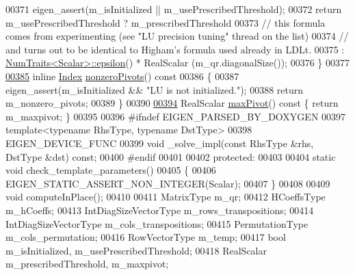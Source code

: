 \begin{DoxyCode}
00371       eigen\_assert(m\_isInitialized || m\_usePrescribedThreshold);
00372       \textcolor{keywordflow}{return} m\_usePrescribedThreshold ? m\_prescribedThreshold
00373       \textcolor{comment}{// this formula comes from experimenting (see "LU precision tuning" thread on the list)}
00374       \textcolor{comment}{// and turns out to be identical to Higham's formula used already in LDLt.}
00375                                       : \hyperlink{group___core___module_struct_eigen_1_1_num_traits}{NumTraits<Scalar>::epsilon}() * RealScalar
      (m\_qr.diagonalSize());
00376     \}
00377 
\hyperlink{group___q_r___module_af1e4d04824084a964c1a6e51db68376f}{00385}     \textcolor{keyword}{inline} \hyperlink{namespace_eigen_a62e77e0933482dafde8fe197d9a2cfde}{Index} \hyperlink{group___q_r___module_af1e4d04824084a964c1a6e51db68376f}{nonzeroPivots}()\textcolor{keyword}{ const}
00386 \textcolor{keyword}{    }\{
00387       eigen\_assert(m\_isInitialized && \textcolor{stringliteral}{"LU is not initialized."});
00388       \textcolor{keywordflow}{return} m\_nonzero\_pivots;
00389     \}
00390 
\hyperlink{group___q_r___module_a7887506237a3bf912aebc9aaa8edacec}{00394}     RealScalar \hyperlink{group___q_r___module_a7887506237a3bf912aebc9aaa8edacec}{maxPivot}()\textcolor{keyword}{ const }\{ \textcolor{keywordflow}{return} m\_maxpivot; \}
00395     
00396 \textcolor{preprocessor}{    #ifndef EIGEN\_PARSED\_BY\_DOXYGEN}
00397     \textcolor{keyword}{template}<\textcolor{keyword}{typename} RhsType, \textcolor{keyword}{typename} DstType>
00398     EIGEN\_DEVICE\_FUNC
00399     \textcolor{keywordtype}{void} \_solve\_impl(\textcolor{keyword}{const} RhsType &rhs, DstType &dst) \textcolor{keyword}{const};
00400 \textcolor{preprocessor}{    #endif}
00401 
00402   \textcolor{keyword}{protected}:
00403     
00404     \textcolor{keyword}{static} \textcolor{keywordtype}{void} check\_template\_parameters()
00405     \{
00406       EIGEN\_STATIC\_ASSERT\_NON\_INTEGER(Scalar);
00407     \}
00408     
00409     \textcolor{keywordtype}{void} computeInPlace();
00410     
00411     MatrixType m\_qr;
00412     HCoeffsType m\_hCoeffs;
00413     IntDiagSizeVectorType m\_rows\_transpositions;
00414     IntDiagSizeVectorType m\_cols\_transpositions;
00415     PermutationType m\_cols\_permutation;
00416     RowVectorType m\_temp;
00417     \textcolor{keywordtype}{bool} m\_isInitialized, m\_usePrescribedThreshold;
00418     RealScalar m\_prescribedThreshold, m\_maxpivot;

\end{DoxyCode}
